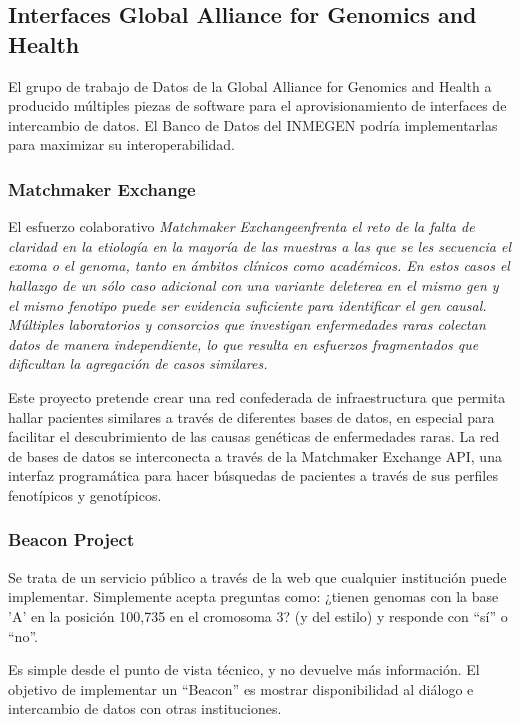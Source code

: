 \documentclass[
10pt, %
letterpaper, %
oneside, %
headinclude,footinclude, %
BCOR5mm, %
]{scrartcl}
\begin{document}
\subsection{Interfaces Global Alliance for Genomics and Health}

El grupo de trabajo de Datos de la Global Alliance for Genomics and
Health a producido múltiples piezas de software para el
aprovisionamiento de interfaces de intercambio de datos. El Banco de
Datos del INMEGEN podría implementarlas para maximizar su
interoperabilidad.

\subsubsection{Matchmaker Exchange}

El esfuerzo colaborativo \em{Matchmaker Exchange}\em  enfrenta el reto de la
falta de claridad en la etiología en la mayoría de las muestras a las
que se les secuencia el exoma o el genoma, tanto en ámbitos clínicos
como académicos. En estos casos el hallazgo de un sólo caso adicional
con una variante deleterea en el mismo gen y el mismo fenotipo puede
ser evidencia suficiente para identificar el gen causal. Múltiples
laboratorios y consorcios que investigan enfermedades raras colectan
datos de manera independiente, lo que resulta en esfuerzos
fragmentados que dificultan la agregación de casos similares.

Este proyecto pretende crear una red confederada de infraestructura
que permita hallar pacientes similares a través de diferentes bases de
datos, en especial para facilitar el descubrimiento de las causas
genéticas de enfermedades raras. La red de bases de datos se
interconecta a través de la Matchmaker Exchange API, una interfaz
programática para hacer búsquedas de pacientes a través de sus
perfiles fenotípicos y genotípicos.\cite{_matchmaker_????}


\subsubsection{Beacon Project}
Se trata de un servicio público a través de la web que cualquier
institución puede implementar. Simplemente acepta preguntas como:
¿tienen genomas con la base 'A' en la posición 100,735 en el cromosoma
3? (y del estilo) y responde con ``sí'' o ``no''.

Es simple desde el punto de vista técnico, y no devuelve más
información. El objetivo de implementar un ``Beacon'' es mostrar
disponibilidad al diálogo e intercambio de datos con otras
instituciones.\cite{_ga4gh_????}
\end{document}
